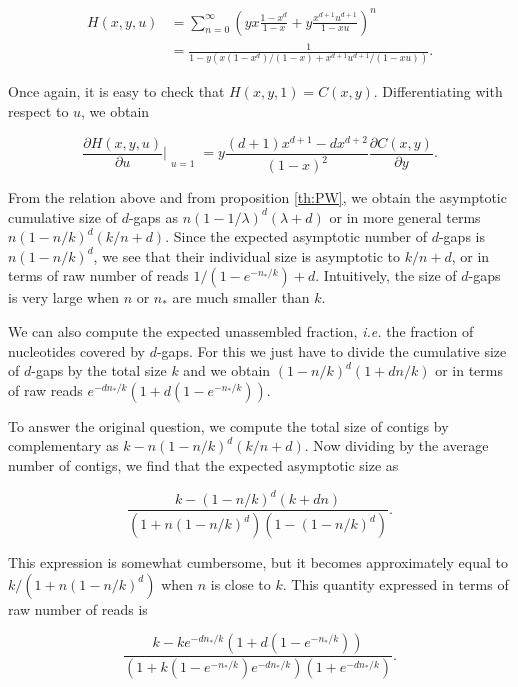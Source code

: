 \documentclass{article}
\begin{document}
\begin{equation*}
\begin{split}
H(x,y,u) &= \sum_{n=0}^\infty \left(yx\frac{1-x^d}{1-x} +
y\frac{x^{d+1}u^{d+1}}{1-xu}\right)^n \\
&= \frac{1}{1-y \left(x(1-x^d)/(1-x) +
x^{d+1}u^{d+1}/(1-xu) \right)}.
\end{split}
\end{equation*}

Once again, it is easy to check that $H(x,y,1) = C(x,y)$. Differentiating
with respect to $u$, we obtain

\begin{equation*}
\frac{\partial H(x,y,u)}{\partial u}\Bigr|_{\substack{\\u=1}}
= y \frac{(d+1)x^{d+1}-dx^{d+2}}{(1-x)^2} \frac{\partial C(x,y)}
{\partial y}.
\end{equation*}

From the relation above and from proposition \ref{th:PW}, we obtain the
asymptotic cumulative size of $d$-gaps as $n(1-1/\lambda)^d(\lambda+d)$ or
in more general terms $n(1-n/k)^d(k/n+d)$.  Since the expected asymptotic
number of $d$-gaps is $n(1-n/k)^d$, we see that their individual size is
asymptotic to $k/n+d$, or in terms of raw number of reads
$1/(1-e^{-n_*/k}) + d$. Intuitively, the size of $d$-gaps is very large
when $n$ or $n_*$ are much smaller than $k$.

We can also compute the expected unassembled fraction, \textit{i.e.} the
fraction of nucleotides covered by $d$-gaps. For this we just have to
divide the cumulative size of $d$-gaps by the total size $k$ and we obtain
$(1-n/k)^d(1+dn/k)$ or in terms of raw reads
$e^{-dn_*/k}(1+d(1-e^{-n_*/k}))$.

To answer the original question, we compute the total size of contigs by
complementary as $k-n(1-n/k)^d(k/n+d)$. Now dividing by the
average number of contigs, we find that the expected asymptotic size as

\begin{equation}
\frac{k-(1-n/k)^d(k+dn)}
{\left(1+n(1-n/k)^d\right)\left(1-(1-n/k)^d \right)}.
\end{equation}

This expression is somewhat cumbersome, but it becomes approximately equal
to $k/(1+n(1-n/k)^d)$ when $n$ is close to $k$. This quantity expressed in
terms of raw number of reads is

\begin{equation}
\frac{k-ke^{-dn_*/k}(1+d(1-e^{-n_*/k}))}{( 1 + k(1-e^{-n_*/k})e^{-dn_*/k}
) (1+e^{-dn_*/k})}.
\end{equation}
\end{document}
